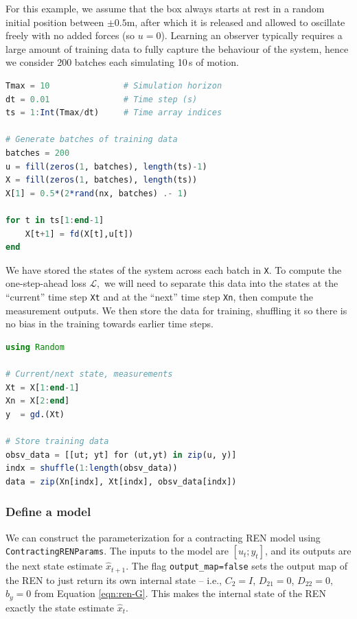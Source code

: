 For this example, we assume that the box always starts at rest in a random initial position between $\pm0.5$m, after which it is released and allowed to oscillate freely with no added forces (so $u = 0$). Learning an observer typically requires a large amount of training data to fully capture the behaviour of the system, hence we consider 200 batches each simulating 10\,s of motion.
\begin{lstlisting}[language = Julia]
Tmax = 10               # Simulation horizon
dt = 0.01               # Time step (s)
ts = 1:Int(Tmax/dt)     # Time array indices

# Generate batches of training data
batches = 200
u = fill(zeros(1, batches), length(ts)-1)
X = fill(zeros(1, batches), length(ts))
X[1] = 0.5*(2*rand(nx, batches) .- 1)

for t in ts[1:end-1]
    X[t+1] = fd(X[t],u[t])
end
\end{lstlisting}
We have stored the states of the system across each batch in \verb|X|. To compute the one-step-ahead loss $\mathcal{L},$ we will need to separate this data into the states at the ``current'' time step \verb|Xt| and at the ``next'' time step \verb|Xn|, then compute the measurement outputs. We then store the data for training, shuffling it so there is no bias in the training towards earlier time steps.
\begin{lstlisting}[language = Julia]
using Random

# Current/next state, measurements
Xt = X[1:end-1]
Xn = X[2:end]
y  = gd.(Xt)

# Store training data
obsv_data = [[ut; yt] for (ut,yt) in zip(u, y)]
indx = shuffle(1:length(obsv_data))
data = zip(Xn[indx], Xt[indx], obsv_data[indx])
\end{lstlisting}

\subsubsection{Define a model} \label{sec:observer-model}

We can construct the parameterization for a contracting REN model using \verb|ContractingRENParams|. The inputs to the model are $[u_t;y_t]$, and its outputs are the next state estimate $\hat{x}_{t+1}$. The flag \verb|output_map=false| sets the output map of the REN to just return its own internal state -- i.e., $C_2 = I$, $D_{21} = 0$, $D_{22} = 0$, $b_y = 0$ from Equation \ref{eqn:ren-G}. This makes the internal state of the REN exactly the state estimate $\hat{x}_t$.


